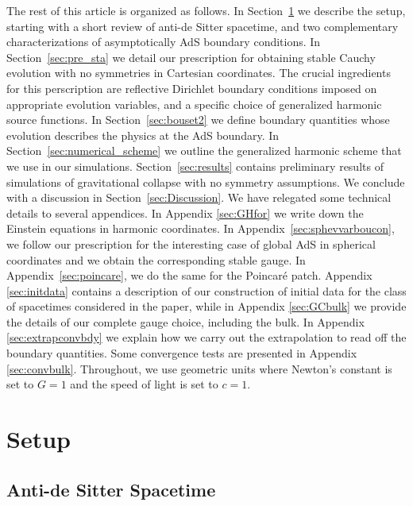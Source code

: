 \documentclass[aps,letterpaper,twocolumn,nofootinbib]{revtex4}
\numberwithin{equation}{section}
\begin{document}
The rest of this article is organized as follows.
In Section~\ref{sec:setup} we describe the setup, starting with a short review of anti-de Sitter spacetime, and two complementary characterizations of asymptotically AdS boundary conditions.
In Section~\ref{sec:pre_sta} we detail our prescription for obtaining stable Cauchy evolution with no symmetries in Cartesian coordinates. 
The crucial ingredients for this perscription are reflective Dirichlet boundary conditions imposed on appropriate evolution variables, and a specific choice of generalized harmonic source functions. In Section~\ref{sec:bouset2} we define boundary quantities whose evolution describes the physics at the AdS boundary.
In Section~\ref{sec:numerical_scheme} we outline the generalized harmonic scheme that we use in our simulations. 
Section~\ref{sec:results} contains preliminary results of simulations of gravitational collapse with no symmetry assumptions.
We conclude with a discussion in Section~\ref{sec:Discussion}. We have relegated some technical details to several appendices. In Appendix \ref{sec:GHfor} we write down the Einstein equations in harmonic coordinates. In Appendix~\ref{sec:sphevvarboucon}, we follow our prescription for the interesting case of global AdS in spherical coordinates and we obtain the corresponding stable gauge. In Appendix~\ref{sec:poincare}, we do the same for the Poincar\'e patch. Appendix \ref{sec:initdata} contains a description of our construction of initial data for the class of spacetimes considered in the paper, while in Appendix \ref{sec:GCbulk} we provide the details of our complete gauge choice, including the bulk. In Appendix \ref{sec:extrapconvbdy} we explain how we carry out the extrapolation to read off the boundary quantities. Some convergence tests are presented in Appendix \ref{sec:convbulk}.
Throughout, we use geometric units where Newton's constant is set to $G=1$ and the speed of light is set to $c=1$.



\section{Setup}\label{sec:setup}

\subsection{Anti-de Sitter Spacetime}\label{subsec:AdS}
\end{document}
